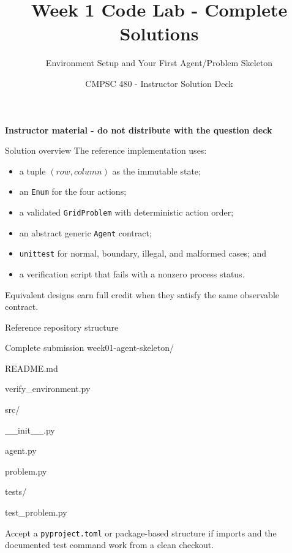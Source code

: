 \documentclass[aspectratio=169,11pt]{beamer}
\title[CMPSC 480 - Week 1 Solutions]{Week 1 Code Lab - Complete Solutions}
\subtitle{Environment Setup and Your First Agent/Problem Skeleton}
\author{CMPSC 480 - Instructor Solution Deck}
\date{}
\begin{document}
\begin{frame}
  \titlepage
  \vspace{-0.35cm}
  \begin{center}
    \color{coursered}\bfseries Instructor material - do not distribute with the question deck
  \end{center}
\end{frame}

\begin{frame}{Solution overview}
  \answerlabel The reference implementation uses:
  \begin{itemize}
    \item a tuple \((row, column)\) as the immutable state;
    \item an \texttt{Enum} for the four actions;
    \item a validated \texttt{GridProblem} with deterministic action order;
    \item an abstract generic \texttt{Agent} contract;
    \item \texttt{unittest} for normal, boundary, illegal, and malformed cases; and
    \item a verification script that fails with a nonzero process status.
  \end{itemize}

  \vspace{0.25cm}
  Equivalent designs earn full credit when they satisfy the same observable
  contract.
\end{frame}

\begin{frame}{Reference repository structure}
  \begin{block}{Complete submission}
    \ttfamily
    week01-agent-skeleton/\par
    \hspace{0.45cm}README.md\par
    \hspace{0.45cm}verify\_environment.py\par
    \hspace{0.45cm}src/\par
    \hspace{0.9cm}\_\_init\_\_.py\par
    \hspace{0.9cm}agent.py\par
    \hspace{0.9cm}problem.py\par
    \hspace{0.45cm}tests/\par
    \hspace{0.9cm}test\_problem.py
  \end{block}
  \gradinglabel Accept a \texttt{pyproject.toml} or package-based structure if
  imports and the documented test command work from a clean checkout.
\end{frame}
\end{document}
